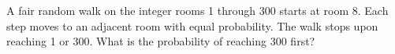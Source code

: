 A fair random walk on the integer rooms 1 through 300 starts at room 8. Each step moves to an adjacent room with equal probability. The walk stops upon reaching 1 or 300. What is the probability of reaching 300 first?
